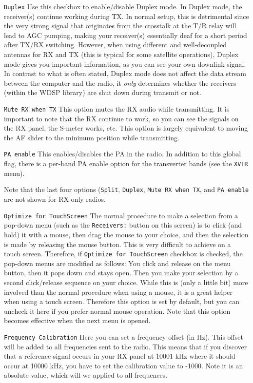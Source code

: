 \documentclass[12pt]{book}
\def\rett#1{\texttt{\color{red}#1}}
\def\bltt#1{\texttt{\color{blue}#1}}
\begin{document}
\rett{Duplex} Use this checkbox to enable/disable Duplex mode. In Duplex mode, the receiver(s)
continue working during TX. In normal setup, this is detrimental since the very strong
signal that originates from the crosstalk at the T/R relay will lead to AGC pumping,
making your receiver(s) essentially deaf for a short period after TX/RX switching.
However, when using different and well-decoupled antennas for RX and TX (this is typical
for some satellite operations), Duplex mode gives you important information, as you can
see your own downlink signal. In contrast to what is often stated, Duplex mode does not
affect the data stream between the computer and the radio, it \textit{only} determines
whether the receivers (within the WDSP library) are shut down during transmit or not.

\rett{Mute RX when TX} This option mutes the RX audio while transmitting. It is important
to note that the RX continue to work, so you can see the signals on the RX panel, the
S-meter works, etc. This option is largely equivalent to moving the AF slider to the
minimum position while transmitting.

\rett{PA enable} This enables/disables the PA in the radio. In addition to this global
flag, there is a per-band PA enable option for the transverter bands (see the \bltt{XVTR}
menu).

Note that the last four options (\rett{Split}, \rett{Duplex}, \rett{Mute RX when TX},
and \rett{PA enable} are not shown for RX-only radios.

\rett{Optimize for TouchScreen} The normal procedure to make a selection from a
pop-down menu (such as the \rett{Receivers:} button on this screen) is to click
(and hold) it with a mouse, then drag the mouse to your choice, and then the selection
is made by releasing the mouse button. This is very difficult to achieve on a touch
screen. Therefore, if \rett{Optimize for TouchScreen} checkbox is checked, the pop-down
menus are modified as follows: You click and release on the menu button, then it pops
down and stays open. Then you make your selection by a second click/release sequence
on your choice. While this is (only a little bit) more involved than the normal procedure
when using a mouse, it is a great helper when using a touch screen. Therefore this
option is set by default, but you can uncheck it here if you prefer normal
mouse operation. Note that this option becomes effective when the next menu is opened.

\rett{Frequency Calibration} Here you can set a frequency offset (in Hz). This offset
will be added to all frequencies sent to the radio. This means that if you discover that
a reference signal occurs in your RX panel at 10001 kHz where it should occur at 10000
kHz, you have to set the calibration value to -1000. Note it is an absolute value,
which will we applied to all frequences.
\end{document}
